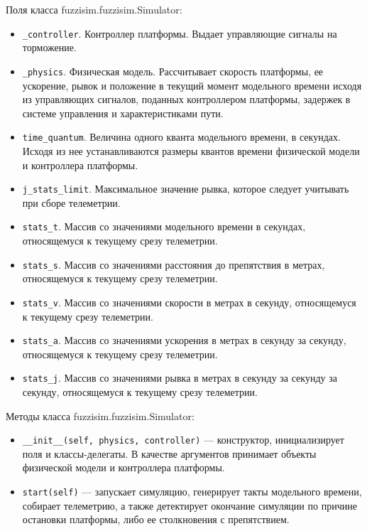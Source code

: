 Поля класса fuzzisim.fuzzisim.Simulator:
\begin{itemize}
	\item \lstinline!_controller!. Контроллер платформы. Выдает управляющие сигналы на торможение.
	\item \lstinline!_physics!. Физическая модель. Рассчитывает скорость платформы, ее ускорение, рывок и положение в текущий момент модельного времени исходя из управляющих сигналов, поданных контроллером платформы, задержек в системе управления  и характеристиками пути.
	\item \lstinline!time_quantum!. Величина одного кванта модельного времени, в секундах. Исходя из нее устанавливаются размеры квантов времени физической модели и контроллера платформы.
	\item \lstinline!j_stats_limit!. Максимальное значение рывка, которое следует учитывать при сборе телеметрии.
	\item \lstinline!stats_t!. Массив со значениями модельного времени в секундах, относящемуся к текущему срезу телеметрии.
	\item \lstinline!stats_s!. Массив со значениями расстояния до препятствия в метрах, относящемуся к текущему срезу телеметрии.
	\item \lstinline!stats_v!. Массив со значениями скорости в метрах в секунду, относящемуся к текущему срезу телеметрии.
	\item \lstinline!stats_a!. Массив со значениями ускорения в метрах в секунду за секунду, относящемуся к текущему срезу телеметрии.
	\item \lstinline!stats_j!. Массив со значениями рывка в метрах в секунду за секунду за секунду, относящемуся к текущему срезу телеметрии.
\end{itemize}

Методы класса fuzzisim.fuzzisim.Simulator:
\begin{itemize}
  \item \lstinline!__init__(self, physics, controller)! — конструктор, инициализирует поля и классы-делегаты. В качестве аргументов принимает объекты физической модели и контроллера платформы.
  \item \lstinline!start(self)! — запускает симуляцию, генерирует такты модельного времени, собирает телеметрию, а также детектирует окончание симуляции по причине остановки платформы, либо ее столкновения с препятствием.
\end{itemize}

